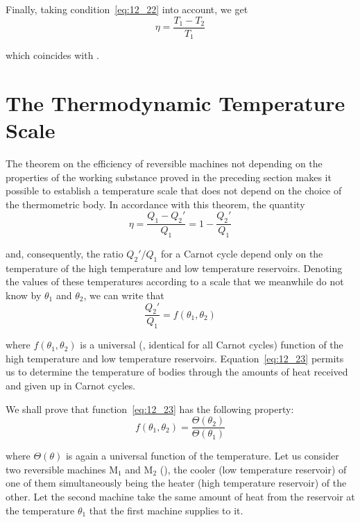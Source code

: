 \noindent
Finally, taking condition~\eqref{eq:12_22} into account, we get
\begin{equation*}
	\eta = \frac{T_1 - T_2}{T_1}
\end{equation*}

\noindent
which coincides with .

\section{The Thermodynamic Temperature Scale}\label{sec:12_3}

The theorem on the efficiency of reversible machines not depending on the properties of the working substance proved in the preceding section makes it possible to establish a temperature scale that does not depend on the choice of the thermometric body. In accordance with this theorem, the quantity
\begin{equation*}
	\eta = \frac{Q_1 - Q_2'}{Q_1} = 1 - \frac{Q_2'}{Q_1}
\end{equation*}

\noindent
and, consequently, the ratio $Q_2'/Q_1$ for a Carnot cycle depend only on the temperature of the high temperature and low temperature reservoirs. Denoting the values of these temperatures according to a scale that we meanwhile do not know by $\theta_1$ and $\theta_2$, we can write that
\begin{equation}\label{eq:12_23}
	\frac{Q_2'}{Q_1} = f(\theta_1,\theta_2)
\end{equation}

\noindent
where $f(\theta_1,\theta_2)$ is a universal (\ie, identical for all Carnot cycles) function of the high temperature and low temperature reservoirs. Equation~\eqref{eq:12_23} permits us to determine the temperature of bodies through the amounts of heat received and given up in Carnot cycles.

We shall prove that function~\eqref{eq:12_23} has the following property:
\begin{equation}\label{eq:12_24}
	f(\theta_1,\theta_2) = \frac{\Theta(\theta_2)}{\Theta(\theta_1)}
\end{equation}

\noindent
where $\Theta(\theta)$ is again a universal function of the temperature. Let us consider two reversible machines M$_1$ and M$_2$ (), the cooler (low temperature reservoir) of one of them simultaneously being the heater (high temperature reservoir) of the other. Let the second machine take the same amount of heat from the reservoir at the temperature $\theta_1$ that the first machine supplies to it.

